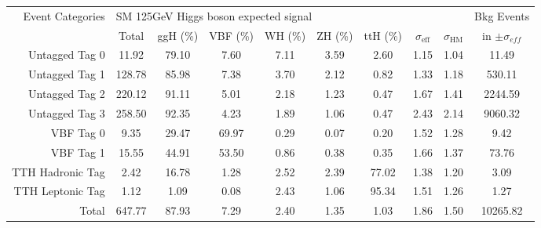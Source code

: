 \begin{tabular}{ |r | c | c | c  | c |  c |  c |  c |  c |  c | }
\hline
\hline
\hline
\multirow{2}{*}{Event Categories} &\multicolumn{8}{|l|}{SM 125GeV Higgs boson expected signal} & Bkg Events\\ \cline{2-9}
  &  Total & ggH (\%) & VBF (\%) & WH (\%) & ZH (\%) & ttH (\%) &   $\sigma_{\text{eff}} $  & $\sigma_{\text{HM}} $ & in $ \pm \sigma_{eff}$  \\
  \hline
  \hline
  Untagged Tag 0 &    11.92  &  79.10  &  7.60  &  7.11  &  3.59  &  2.60 & 1.15 & 1.04 & 11.49 \\
  Untagged Tag 1 &    128.78  &  85.98  &  7.38  &  3.70  &  2.12  &  0.82 & 1.33 & 1.18 & 530.11 \\
  Untagged Tag 2 &    220.12  &  91.11  &  5.01  &  2.18  &  1.23  &  0.47 & 1.67 & 1.41 & 2244.59 \\
  Untagged Tag 3 &    258.50  &  92.35  &  4.23  &  1.89  &  1.06  &  0.47 & 2.43 & 2.14 & 9060.32 \\
  VBF Tag 0 &    9.35  &  29.47  &  69.97  &  0.29  &  0.07  &  0.20 & 1.52 & 1.28 & 9.42 \\
  VBF Tag 1 &    15.55  &  44.91  &  53.50  &  0.86  &  0.38  &  0.35 & 1.66 & 1.37 & 73.76 \\
  TTH Hadronic Tag &    2.42  &  16.78  &  1.28  &  2.52  &  2.39  &  77.02 & 1.38 & 1.20 & 3.09 \\
  TTH Leptonic Tag &    1.12  &  1.09  &  0.08  &  2.43  &  1.06  &  95.34 & 1.51 & 1.26 & 1.27 \\
  Total &    647.77  &  87.93  &  7.29  &  2.40  &  1.35  &  1.03 & 1.86 & 1.50 & 10265.82 \\
  \hline
  \hline
  \end{tabular}

